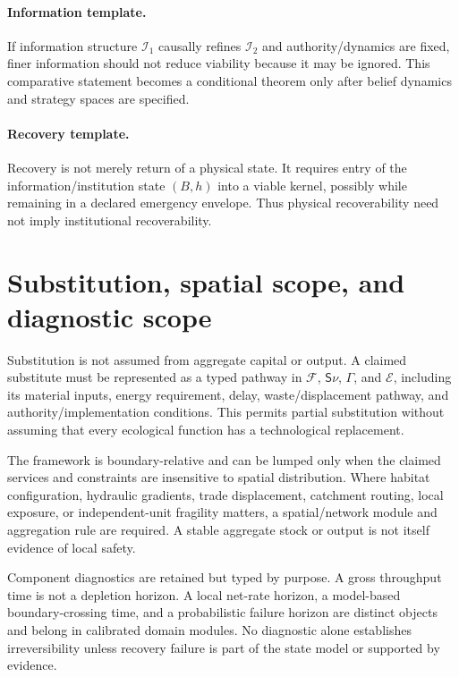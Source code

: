 \documentclass[11pt]{article}
\begin{document}
\paragraph{Information template.} If information structure $\mathcal I_1$ causally refines $\mathcal I_2$ and authority/dynamics are fixed, finer information should not reduce viability because it may be ignored. This comparative statement becomes a conditional theorem only after belief dynamics and strategy spaces are specified.

\paragraph{Recovery template.} Recovery is not merely return of a physical state. It requires entry of the information/institution state $(B,h)$ into a viable kernel, possibly while remaining in a declared emergency envelope. Thus physical recoverability need not imply institutional recoverability.

\section{Substitution, spatial scope, and diagnostic scope}
Substitution is not assumed from aggregate capital or output. A claimed substitute must be represented as a typed pathway in $\mathcal F$, $\mathsf S\nu$, $\Gamma$, and $\mathcal E$, including its material inputs, energy requirement, delay, waste/displacement pathway, and authority/implementation conditions. This permits partial substitution without assuming that every ecological function has a technological replacement.

The framework is boundary-relative and can be lumped only when the claimed services and constraints are insensitive to spatial distribution. Where habitat configuration, hydraulic gradients, trade displacement, catchment routing, local exposure, or independent-unit fragility matters, a spatial/network module and aggregation rule are required. A stable aggregate stock or output is not itself evidence of local safety.

Component diagnostics are retained but typed by purpose. A gross throughput time is not a depletion horizon. A local net-rate horizon, a model-based boundary-crossing time, and a probabilistic failure horizon are distinct objects and belong in calibrated domain modules. No diagnostic alone establishes irreversibility unless recovery failure is part of the state model or supported by evidence.
\end{document}
